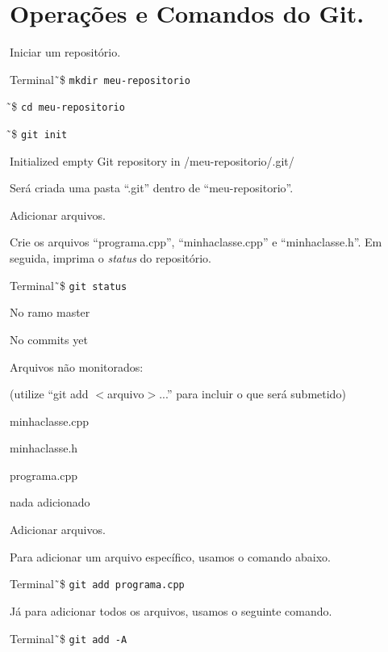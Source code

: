 \documentclass[brazil,aspectratio=169]{beamer}
\newcommand{\terminal}[1]{\textcolor{my-green}{\texttt{#1}}}
\begin{document}
\section{Operações e Comandos do Git.}
\begin{frame}{Iniciar um repositório.}

  \begin{exampleblock}{Terminal}
    \~\,\$ \terminal{mkdir meu-repositorio}

    \~\,\$ \terminal{cd meu-repositorio}

    \~\,\$ \terminal{git init}

    Initialized empty Git repository in /meu-repositorio/.git/
  \end{exampleblock}

  Será criada uma pasta ``.git'' dentro de ``meu-repositorio''.

\end{frame}

\begin{frame}{Adicionar arquivos.}

  Crie os arquivos ``programa.cpp'', ``minhaclasse.cpp'' e ``minhaclasse.h''. Em seguida, imprima o \textit{status}
do repositório.

  \begin{exampleblock}{Terminal}
    \~\,\$ \terminal{git status}

    No ramo master

    No commits yet

    Arquivos não monitorados:

    (utilize ``git add $<$arquivo$>$...'' para incluir o que será submetido)
  
	minhaclasse.cpp
	
	minhaclasse.h
	
	programa.cpp

    nada adicionado 
  \end{exampleblock}
  
\end{frame}

\begin{frame}{Adicionar arquivos.}

  Para adicionar um arquivo específico, usamos o comando abaixo.

  \begin{exampleblock}{Terminal}
    \~\,\$ \terminal{git add programa.cpp}
  \end{exampleblock}

  Já para adicionar todos os arquivos, usamos o seguinte comando.

  \begin{exampleblock}{Terminal}
    \~\,\$ \terminal{git add -A}
  \end{exampleblock}
  
\end{frame}
\end{document}
